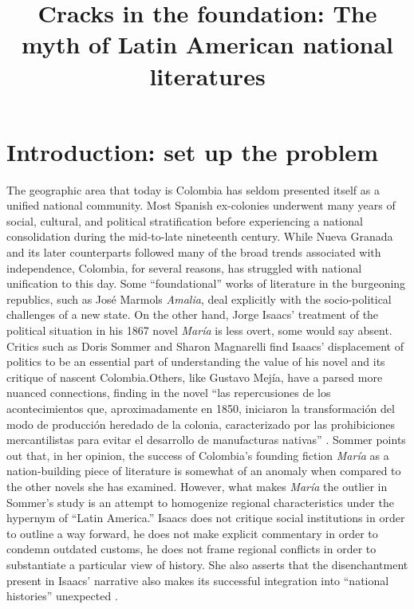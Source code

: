 \documentclass[12pt]{report}
\title{Cracks in the foundation: The myth of Latin American national literatures}
\begin{document}

\section{Introduction: set up the problem}
The geographic area that today is Colombia has seldom presented itself as a unified national community. Most Spanish ex-colonies underwent many years of social, cultural, and political stratification before experiencing a national consolidation during the mid-to-late nineteenth century. 
While Nueva Granada and its later counterparts followed many of the broad trends associated with independence, Colombia, for several reasons, has struggled with national unification to this day.
Some \enquote{foundational} works of literature in the burgeoning republics, such as José Marmols \textit{Amalia}, deal explicitly with the socio-political challenges of a new state.
On the other hand, Jorge Isaacs’ treatment of the political situation in his 1867 novel \textit{María} is less overt, some would say absent. Critics such as Doris Sommer and Sharon Magnarelli find Isaacs’ displacement of politics to be an essential part of understanding the value of his novel and its critique of nascent Colombia.Others, like Gustavo Mejía, have a parsed more nuanced connections, finding in the novel \enquote{las repercusiones de los acontecimientos que, aproximadamente en 1850, iniciaron la transformación del modo de producción heredado de la colonia, caracterizado por las prohibiciones mercantilistas para evitar el desarrollo de manufacturas nativas} \autocite[262]{Mejia1976}.
Sommer points out that, in her opinion, the success of Colombia's founding fiction \textit{María} as a nation-building piece of literature is somewhat of an anomaly when compared to the other novels she has examined. 
However, what makes \textit{María} the outlier in Sommer's study is an attempt to homogenize regional characteristics under the hypernym of \enquote{Latin America.}
Isaacs does not critique social institutions in order to outline a way forward, he does not make explicit commentary in order to condemn outdated customs, he does not frame regional conflicts in order to substantiate a particular view of history. 
She also asserts that the disenchantment present in Isaacs' narrative also makes its successful integration into \enquote{national histories} unexpected \autocite[30]{Sommer1991}.
\end{document}
